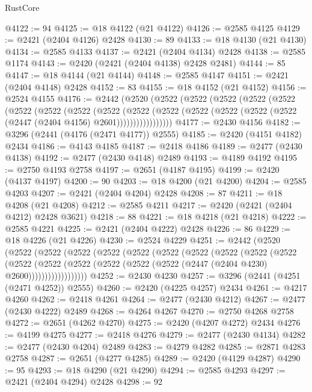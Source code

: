 \begin{lexlean}{RustCore}
\begin{coremodule}
@4122 := 94
@4125 := @18 @4122 (@21 @4122)
@4126 := @2585 @4125
@4129 := @2421 (@2404 @4126) @2428
@4130 := 89
@4133 := @18 @4130 (@21 @4130)
@4134 := @2585 @4133
@4137 := @2421 (@2404 @4134) @2428
@4138 := @2585 @1174
@4143 := @2420 (@2421 (@2404 @4138) @2428 @2481)
@4144 := 85
@4147 := @18 @4144 (@21 @4144)
@4148 := @2585 @4147
@4151 := @2421 (@2404 @4148) @2428
@4152 := 83
@4155 := @18 @4152 (@21 @4152)
@4156 := @2524 @4155
@4176 := @2442
    (@2520
      (@2522
        (@2522
          (@2522
            (@2522
              (@2522
                (@2522
                  (@2522
                    (@2522
                      (@2522
                        (@2522
                          (@2522
                            (@2522 (@2522 (@2522 (@2522 (@2447 (@2404 @4156) @2601)))))))))))))))))
@4177 := @2430 @4156
@4182 := @3296 (@2441 (@4176 (@2471 @4177)) @2555)
@4185 := @2420 (@4151 @4182) @2434
@4186 := @4143 @4185
@4187 := @2418 @4186
@4189 := @2477 (@2430 @4138)
@4192 := @2477 (@2430 @4148) @2489
@4193 := @4189 @4192
@4195 := @2750 @4193 @2758
@4197 := @2651 (@4187 @4195)
@4199 := @2420 (@4137 @4197)
@4200 := 90
@4203 := @18 @4200 (@21 @4200)
@4204 := @2585 @4203
@4207 := @2421 (@2404 @4204) @2428
@4208 := 87
@4211 := @18 @4208 (@21 @4208)
@4212 := @2585 @4211
@4217 := @2420 (@2421 (@2404 @4212) @2428 @3621)
@4218 := 88
@4221 := @18 @4218 (@21 @4218)
@4222 := @2585 @4221
@4225 := @2421 (@2404 @4222) @2428
@4226 := 86
@4229 := @18 @4226 (@21 @4226)
@4230 := @2524 @4229
@4251 := @2442
    (@2520
      (@2522
        (@2522
          (@2522
            (@2522
              (@2522
                (@2522
                  (@2522
                    (@2522
                      (@2522
                        (@2522
                          (@2522
                            (@2522
                              (@2522
                                (@2522 (@2522 (@2522 (@2447 (@2404 @4230) @2600))))))))))))))))))
@4252 := @2430 @4230
@4257 := @3296 (@2441 (@4251 (@2471 @4252)) @2555)
@4260 := @2420 (@4225 @4257) @2434
@4261 := @4217 @4260
@4262 := @2418 @4261
@4264 := @2477 (@2430 @4212)
@4267 := @2477 (@2430 @4222) @2489
@4268 := @4264 @4267
@4270 := @2750 @4268 @2758
@4272 := @2651 (@4262 @4270)
@4275 := @2420 (@4207 @4272) @2434
@4276 := @4199 @4275
@4277 := @2418 @4276
@4279 := @2477 (@2430 @4134)
@4282 := @2477 (@2430 @4204) @2489
@4283 := @4279 @4282
@4285 := @2871 @4283 @2758
@4287 := @2651 (@4277 @4285)
@4289 := @2420 (@4129 @4287)
@4290 := 95
@4293 := @18 @4290 (@21 @4290)
@4294 := @2585 @4293
@4297 := @2421 (@2404 @4294) @2428
@4298 := 92

\end{coremodule}
\end{lexlean}
